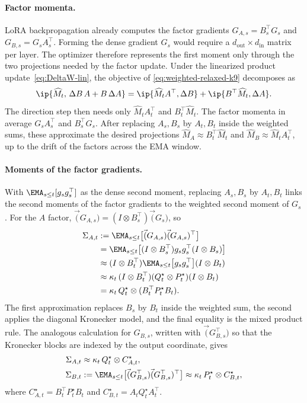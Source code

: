 \paragraph{Factor momenta.}
LoRA backpropagation already computes the factor gradients
$G_{A,s}=B_s^\top G_s$ and $G_{B,s}=G_sA_s^\top$. Forming the dense
gradient $G_s$ would require a $d_{\mathrm{out}}\times d_{\mathrm{in}}$
matrix per layer. The optimizer therefore represents the first moment only
through the two projections needed by the factor update. Under the
linearized product update~\eqref{eq:DeltaW-lin}, the objective of
\eqref{eq:weighted-relaxed-k9} decomposes as
\[
  \ip{\widehat M_t,\,\Delta B\,A+B\,\Delta A}
  =
  \ip{\widehat M_tA^\top,\Delta B}
  +
  \ip{B^\top\widehat M_t,\Delta A}.
\]
The direction step then needs only $\widehat M_tA_t^\top$ and
$B_t^\top\widehat M_t$. The factor momenta in  average
$G_sA_s^\top$ and $B_s^\top G_s$. After replacing $A_s,B_s$ by
$A_t,B_t$ inside the weighted sums, these approximate the desired
projections $\widehat M_A\approx B_t^\top\widehat M_t$ and
$\widehat M_B\approx \widehat M_tA_t^\top$, up to the drift of the factors
across the EMA window.

\paragraph{Moments of the factor gradients.}
With $\EMA_{s\le t}[g_sg_s^\top]$ as the dense second moment, replacing
$A_s,B_s$ by $A_t,B_t$ links the second moments of the factor gradients to
the weighted second moment of $G_s$. For the $A$ factor,
$\vec(G_{A,s})=(I\otimes B_s^\top)\vec(G_s)$, so
\begin{align*}
 \Sigma_{A,t}
 &:= \EMA_{s\le t}\big[\vec(G_{A,s})\vec(G_{A,s})^\top\big] \\
 &= \EMA_{s\le t}\big[
      (I\otimes B_s^\top)g_sg_s^\top(I\otimes B_s)
    \big] \\
 &\approx
    (I\otimes B_t^\top)
    \EMA_{s\le t}\big[g_sg_s^\top\big]
    (I\otimes B_t) \\
 &\approx
    \kappa_t\,(I\otimes B_t^\top)
    (Q^\star_t\otimes P^\star_t)
    (I\otimes B_t) \\
 &= \kappa_t\,Q^\star_t\otimes(B_t^\top P^\star_tB_t).
\end{align*}
The first approximation replaces $B_s$ by $B_t$ inside the weighted
sum, the second applies the diagonal Kronecker model, and the final
equality is the mixed product rule. The analogous calculation for
$G_{B,s}$, written with $\vec(G_{B,s}^\top)$ so that the Kronecker
blocks are indexed by the output coordinate, gives
\begin{align}
  \Sigma_{A,t}
    &\approx \kappa_t\,Q^\star_t\otimes C^\star_{A,t},
  \nonumber \\
  \Sigma_{B,t}
    &:= \EMA_{s\le t}\big[
      \vec(G_{B,s}^\top)\vec(G_{B,s}^\top)^\top
    \big]
    \approx \kappa_t\,P^\star_t\otimes C^\star_{B,t},
  \label{eq:observable-moments-k9}
\end{align}
where
$C^\star_{A,t}=B_t^\top P^\star_tB_t$ and
$C^\star_{B,t}=A_tQ^\star_tA_t^\top$.

